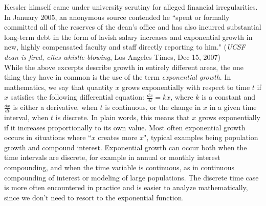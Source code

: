 Kessler himself came under university scrutiny for alleged financial irregularities. In January 2005, an anonymous source contended he ``spent or formally committed all of the reserves of the dean's office and has also incurred substantial long-term debt in the form of lavish salary increases and exponential growth in new, highly compensated faculty and staff directly reporting to him." (\emph{UCSF dean is fired, cites whistle-blowing}, Los Angeles Times, Dec 15, 2007) \\

While the above excerpts describe growth in entirely different areas, the one thing they have in common is the use of the term \emph{exponential growth}. In mathematics, we say that quantity $x$ grows exponentially with respect to time $t$ if $x$ satisfies the following differential equation: $\frac{dx}{dt}=kx$, where $k$ is a constant and $\frac{dx}{dt}$ is either a derivative, when $t$ is continuous, or the change in $x$ in a given time interval, when $t$ is discrete. In plain words, this means that $x$ grows exponentially if it increases proportionally to its own value. Most often exponential growth occurs in situations where ``$x$ creates more $x$", typical examples being population growth and compound interest. Exponential growth can occur both when the time intervals are discrete, for example in annual or monthly interest compounding, and when the time variable is continuous, as in continuous compounding of interest or modeling of large populations. The discrete time case is more often encountered in practice and is easier to analyze mathematically, since we don't need to resort to the exponential function. \\

 \vspace{0.2cm}

